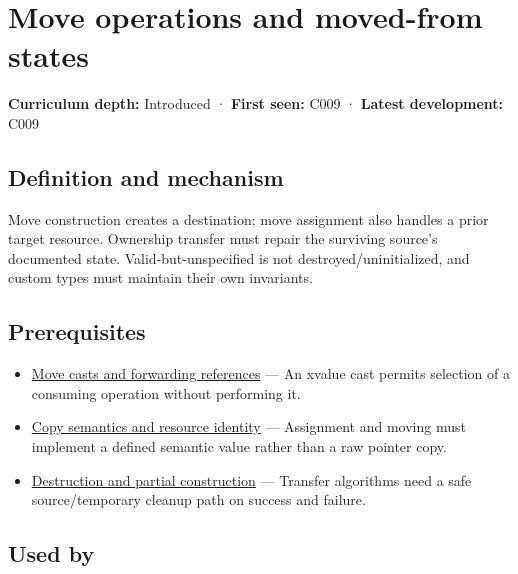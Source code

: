 \hypertarget{appendix-5636651017c2}{}\label{referencestart:appendix-5636651017c2}
\section{Move operations and moved-from states}\label{appendix-5636651017c2-move-operations-and-moved-from-states}

\textbf{Curriculum depth:} Introduced · \textbf{First seen:} C009 · \textbf{Latest development:} C009

\begin{allmightroledefinition}

\subsection{Definition and mechanism}\label{appendix-5636651017c2-definition-and-mechanism}

Move construction creates a destination; move assignment also handles a prior target resource. Ownership transfer must repair the surviving source's documented state. Valid-but-unspecified is not destroyed/uninitialized, and custom types must maintain their own invariants.

\end{allmightroledefinition}

\subsection{Prerequisites}\label{appendix-5636651017c2-prerequisites}

\begin{itemize}
\tightlist
\item
  \hyperref[appendix-0104b704fb11]{Move casts and forwarding references} --- An xvalue cast permits selection of a consuming operation without performing it.
\item
  \hyperref[appendix-1340cd1ce582]{Copy semantics and resource identity} --- Assignment and moving must implement a defined semantic value rather than a raw pointer copy.
\item
  \hyperref[appendix-9bfe377cef7a]{Destruction and partial construction} --- Transfer algorithms need a safe source/temporary cleanup path on success and failure.
\end{itemize}

\subsection{Used by}\label{appendix-5636651017c2-used-by}

